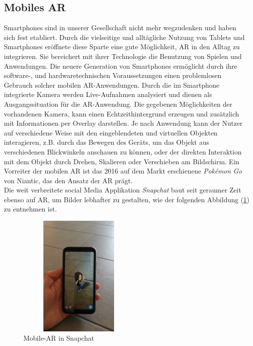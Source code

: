\subsection{Mobiles AR}
\label{sec:mobilesAR}
Smartphones sind in unserer Gesellschaft nicht mehr wegzudenken und haben sich fest etabliert. Durch die vielseitige und alltägliche Nutzung 
von Tablets und Smartphones eröffnete diese Sparte eine gute Möglichkeit, \acl{AR} in den Alltag zu integrieren. Sie bereichert mit ihrer 
Technologie die Benutzung von Spielen und Anwendungen. Die neuere Generation von Smartphones ermöglicht durch ihre software-, und 
hardwaretechnischen Voraussetzungen einen problemlosen Gebrauch solcher mobilen \acs{AR}-Anwendungen. 
Durch die im Smartphone integrierte Kamera werden Live-Aufnahmen analysiert und dienen als Ausgangssituation für die \acs{AR}-Anwendung. 
Die gegebenen Möglichkeiten der vorhandenen Kamera, kann einen Echtzeithintergrund erzeugen und zusätzlich mit Informationen per Overlay darstellen. 
Je nach Anwendung kann der Nutzer auf verschiedene Weise mit den eingeblendeten und virtuellen Objekten interagieren, z.B. durch das 
Bewegen des Geräts, um das Objekt aus verschiedenen Blickwinkeln anschauen zu können, oder der direkten Interaktion mit dem Objekt durch 
Drehen, Skalieren oder Verschieben am Bildschirm. Ein Vorreiter der mobilen AR ist das 2016 auf dem Markt erschienene \textit{Pokémon Go} 
von Niantic, das den Ansatz der \acs{AR} prägt. \cite{pokemongo.2016a}
\\ 
\linebreak
Die weit verbreitete social Media Applikation \textit{Snapchat} baut seit geraumer Zeit ebenso auf \acl{AR}, um Bilder lebhafter zu 
gestalten, wie der folgenden Abbildung (\ref{pic:snapchatAR}) zu entnehmen ist. 
\begin{figure}[hbt!]
    \centering
    \includegraphics[width=6cm,height=6cm,keepaspectratio]{2Grundlagen/Bilder/snapchatAR.jpeg}
    \caption{Mobile-AR in Snapchat}
    \label{pic:snapchatAR}
\end{figure}
